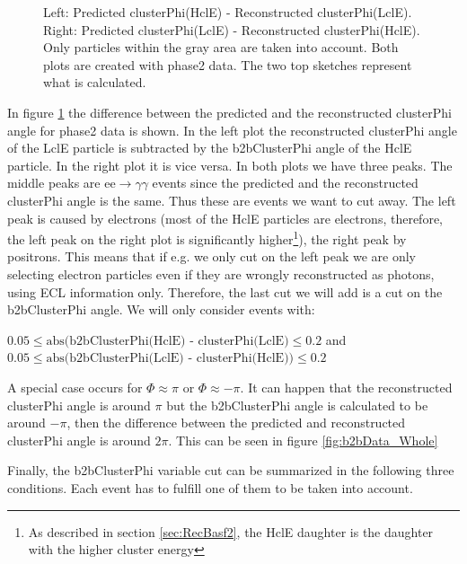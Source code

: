 \documentclass[a4paper,11pt,twosided,final,german,openbib,pdftex,listof=totoc,bibliography=totoc]{scrbook}
\begin{document}
\begin{figure}[h!]
\begin{minipage}[b]{\textwidth}
	\caption[b2bClusterPhi - clusterPhi For Beamtime-Data]{Left: Predicted clusterPhi(HclE) - Reconstructed clusterPhi(LclE). Right: Predicted clusterPhi(LclE) - Reconstructed clusterPhi(HclE). Only particles within the gray area are taken into account. Both plots are created with phase2 data. The two top sketches represent what is calculated.}
	\label{fig:b2bData}

\end{minipage}
\end{figure}


In figure \ref{fig:b2bData} the difference between the predicted and the reconstructed clusterPhi angle for phase2 data is shown. In the left plot the reconstructed clusterPhi angle of the LclE particle is subtracted by the b2bClusterPhi angle of the HclE particle. In the right plot it is vice versa. In both plots we have three peaks. The middle peaks are $\textrm{ee} \rightarrow \gamma \gamma$ events since the predicted and the reconstructed clusterPhi angle is the same. Thus these are events we want to cut away. The left peak is caused by electrons (most of the HclE particles are electrons, therefore, the left peak on the right plot is significantly higher\footnote{As described in section \ref{sec:RecBasf2}, the HclE daughter is the daughter with the higher cluster energy}), the right peak by positrons. This means that if e.g. we only cut on the left peak we are only selecting electron particles even if they are wrongly reconstructed as photons, using ECL information only. 
Therefore, the last cut we will add is a cut on the b2bClusterPhi angle. We will only consider events with:
\newline

 $0.05 \leq \textrm{abs(b2bClusterPhi(HclE) - clusterPhi(LclE)} \leq 0.2 $ and  $0.05 \leq \textrm{abs(b2bClusterPhi(LclE) - clusterPhi(HclE))} \leq 0.2$
\newline



A special case occurs for $\Phi \approx \pi$ or $\Phi \approx -\pi$. It can happen that the reconstructed clusterPhi angle is around $\pi$ but the b2bClusterPhi angle is calculated to be around $-\pi$, then the difference between the predicted and reconstructed clusterPhi angle is around $2\pi$. This can be seen in figure \ref{fig:b2bData_Whole}

Finally, the b2bClusterPhi variable cut can be summarized in the following three conditions. Each event has to fulfill one of them to be taken into account.
\end{document}
